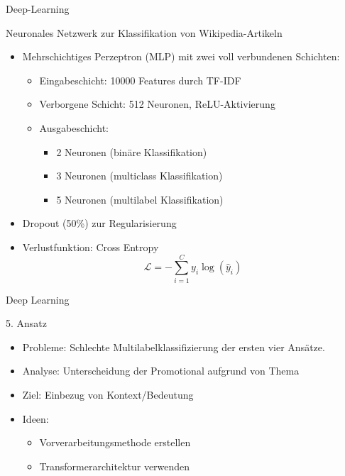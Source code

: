 \documentclass[aspectratio=169]{beamer} %
\begin{document}
\begin{frame}{Deep-Learning}
    \begin{block}{Neuronales Netzwerk zur Klassifikation von Wikipedia-Artikeln}
        \begin{itemize}
            \item Mehrschichtiges Perzeptron (MLP) mit zwei voll verbundenen Schichten:
                  \begin{itemize}
                      \item Eingabeschicht: 10000 Features durch TF-IDF
                      \item Verborgene Schicht: 512 Neuronen, ReLU-Aktivierung
                      \item Ausgabeschicht:
                            \begin{itemize}
                                \item 2 Neuronen (binäre Klassifikation)
                                \item 3 Neuronen (multiclass Klassifikation)
                                \item 5 Neuronen (multilabel Klassifikation)
                            \end{itemize}
                  \end{itemize}
            \item Dropout (50\%) zur Regularisierung
            \item Verlustfunktion: Cross Entropy
                  \begin{equation*}
                      \mathcal{L} = - \sum_{i=1}^{C} y_i \log(\hat{y}_i)
                  \end{equation*}
        \end{itemize}
    \end{block}
\end{frame}

\begin{frame}{Deep Learning}
    \begin{block}{5. Ansatz}
        \begin{itemize}
            \item Probleme: Schlechte Multilabelklassifizierung der ersten vier Ansätze.
            \item    Analyse: Unterscheidung der Promotional aufgrund von Thema
            \item        Ziel:
                  Einbezug von Kontext/Bedeutung \\
            \item Ideen:
                  \begin{itemize}
                      \item Vorverarbeitungsmethode erstellen
                      \item Transformerarchitektur verwenden
                  \end{itemize}
        \end{itemize}
    \end{block}
\end{frame}
\end{document}
